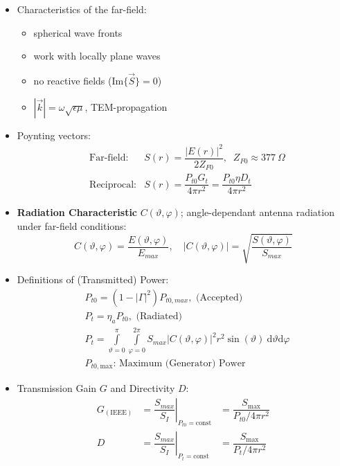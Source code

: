 \begin{itemize}
    \item Characteristics of the far-field:
        \begin{itemize}
            \itemsep0pt
            \item spherical wave fronts
            \item work with locally plane waves
            \item no reactive fields (\(\mathrm{Im}\{\vec{S}\} = 0\))
            \item \(|\vec{k}| = \omega \sqrt{\epsilon\mu}\), TEM-propagation
        \end{itemize}
    \item Poynting vectors: 
        \begin{align*}
            &\text{Far-field:} &S(r) = \dfrac{|E(r)|^2}{2 Z_{F0}},\;\; Z_{F0} \approx \SI{377}{\Omega}\\
            &\text{Reciprocal:} &S(r) = \dfrac{P_{t0}G_t}{4\pi r^2} = \dfrac{P_{t0}\eta D_t}{4\pi r^2}
        \end{align*}
    \item \textbf{Radiation Characteristic} $C(\vartheta, \varphi)$; angle-dependant antenna radiation under far-field conditions:
        \begin{equation*}
            C(\vartheta, \varphi) = \dfrac{E(\vartheta, \varphi)}{E_{max}}, \quad
            |C(\vartheta, \varphi)| = \sqrt{\dfrac{S(\vartheta, \varphi)}{S_{max}}}
        \end{equation*}
    \item Definitions of (Transmitted) Power:
        \begin{align*}
            &P_{t0} = (1- |\Gamma|^2) P_{t0,max},\text{ (Accepted)}\\
            &P_t = \eta_a P_{t0},\text{ (Radiated)}\\
            &P_t = \int\limits_{\vartheta=0}^{\pi} \int\limits_{\varphi=0}^{2\pi} S_{max} |C(\vartheta, \varphi)|^2 r^2 \sin(\vartheta)\: \mathrm{d}\vartheta \mathrm{d}\varphi\\
            &P_{t0,\mathrm{max}}\text{: Maximum (Generator) Power}
        \end{align*}
    \item Transmission Gain $G$ and Directivity $D$:
        \begin{align*}
            G_{(\mathrm{IEEE})} &= \left.\dfrac{S_{max}}{S_I}\right|_{P_{t0} = \mathrm{const}} &= \dfrac{S_{\mathrm{max}}}{P_{t0} / 4\pi r^2}\\
            D &= \left.\dfrac{S_{max}}{S_I}\right|_{P_{t} = \mathrm{const}} &= \dfrac{S_{\mathrm{max}}}{P_t / 4\pi r^2}

\end{align*}
\end{itemize}
